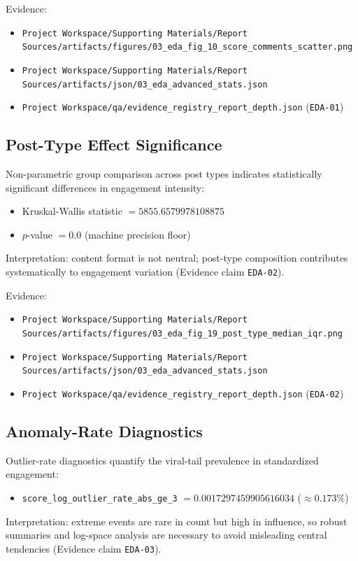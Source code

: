 Evidence:
\begin{itemize}
  \item \verb|Project Workspace/Supporting Materials/Report Sources/artifacts/figures/03_eda_fig_10_score_comments_scatter.png|
  \item \verb|Project Workspace/Supporting Materials/Report Sources/artifacts/json/03_eda_advanced_stats.json|
  \item \verb|Project Workspace/qa/evidence_registry_report_depth.json| (\texttt{EDA-01})
\end{itemize}

\subsection{Post-Type Effect Significance}
Non-parametric group comparison across post types indicates statistically significant differences in engagement intensity:
\begin{itemize}
  \item Kruskal-Wallis statistic \(= 5855.6579978108875\)
  \item \(p\)-value \(= 0.0\) (machine precision floor)
\end{itemize}
Interpretation: content format is not neutral; post-type composition contributes systematically to engagement variation (Evidence claim \texttt{EDA-02}).

Evidence:
\begin{itemize}
  \item \verb|Project Workspace/Supporting Materials/Report Sources/artifacts/figures/03_eda_fig_19_post_type_median_iqr.png|
  \item \verb|Project Workspace/Supporting Materials/Report Sources/artifacts/json/03_eda_advanced_stats.json|
  \item \verb|Project Workspace/qa/evidence_registry_report_depth.json| (\texttt{EDA-02})
\end{itemize}

\subsection{Anomaly-Rate Diagnostics}
Outlier-rate diagnostics quantify the viral-tail prevalence in standardized engagement:
\begin{itemize}
  \item \texttt{score\_log\_outlier\_rate\_abs\_ge\_3} \(= 0.0017297459905616034\) (\(\approx 0.173\%\))
\end{itemize}
Interpretation: extreme events are rare in count but high in influence, so robust summaries and log-space analysis are necessary to avoid misleading central tendencies (Evidence claim \texttt{EDA-03}).

